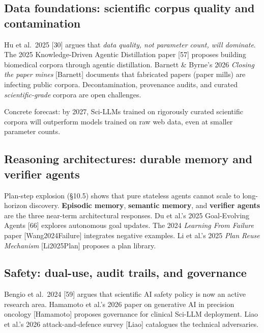 \subsection{Data foundations: scientific corpus quality and contamination}\label{data-foundations-scientific-corpus-quality-and-contamination}

Hu et al.~2025 {[}30{]} argues that \emph{data quality, not parameter count, will dominate}. The 2025 Knowledge-Driven Agentic Distillation paper {[}57{]} proposes building biomedical corpora through agentic distillation. Barnett \& Byrne's 2026 \emph{Closing the paper mines} {[}Barnett{]} documents that fabricated papers (paper mills) are infecting public corpora. Decontamination, provenance audits, and curated \emph{scientific-grade} corpora are open challenges.

Concrete forecast: by 2027, Sci-LLMs trained on rigorously curated scientific corpora will outperform models trained on raw web data, even at smaller parameter counts.

\subsection{Reasoning architectures: durable memory and verifier agents}\label{reasoning-architectures-durable-memory-and-verifier-agents}

Plan-step explosion (§10.5) shows that pure stateless agents cannot scale to long-horizon discovery. \textbf{Episodic memory}, \textbf{semantic memory}, and \textbf{verifier agents} are the three near-term architectural responses. Du et al.'s 2025 Goal-Evolving Agents {[}66{]} explores autonomous goal updates. The 2024 \emph{Learning From Failure} paper {[}Wang2024Failure{]} integrates negative examples. Li et al.'s 2025 \emph{Plan Reuse Mechanism} {[}Li2025Plan{]} proposes a plan library.

\subsection{Safety: dual-use, audit trails, and governance}\label{safety-dual-use-audit-trails-and-governance}

Bengio et al.~2024 {[}59{]} argues that scientific AI safety policy is now an active research area. Hamamoto et al.'s 2026 paper on generative AI in precision oncology {[}Hamamoto{]} proposes governance for clinical Sci-LLM deployment. Liao et al.'s 2026 attack-and-defence survey {[}Liao{]} catalogues the technical adversaries.

